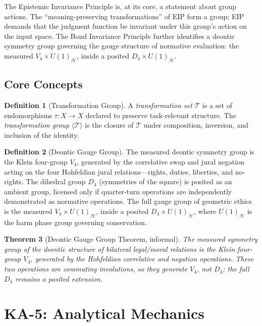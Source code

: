 \documentclass[12pt,letterpaper]{article}
\newtheorem{theorem}{Theorem}[section]
\theoremstyle{definition}
\newtheorem{definition}[theorem]{Definition}
\theoremstyle{plain}
\newcommand{\calT}{\mathcal{T}}
\newcommand{\calH}{\mathcal{H}}
\newcommand{\genT}{\langle \mathcal{T} \rangle}
\begin{document}
The Epistemic Invariance Principle is, at its core, a statement about group actions. The ``meaning-preserving transformations'' of EIP form a group; EIP demands that the judgment function be invariant under this group's action on the input space. The Bond Invariance Principle further identifies a deontic symmetry group governing the gauge structure of normative evaluation: the measured $V_4 \times U(1)_\calH$, inside a posited $D_4 \times U(1)_\calH$.

\subsection{Core Concepts}

\begin{definition}[Transformation Group]
A \emph{transformation set} $\calT$ is a set of endomorphisms $\tau: X \to X$ declared to preserve task-relevant structure. The \emph{transformation group} $\genT$ is the closure of $\calT$ under composition, inversion, and inclusion of the identity.
\end{definition}

\begin{definition}[Deontic Gauge Group]
The measured deontic symmetry group is the Klein four-group $V_4$, generated by the correlative swap and jural negation acting on the four Hohfeldian jural relations---rights, duties, liberties, and no-rights.  The dihedral group $D_4$ (symmetries of the square) is posited as an ambient group, licensed only if quarter-turn operations are independently demonstrated as normative operations.  The full gauge group of geometric ethics is the measured $V_4 \times U(1)_\calH$, inside a posited $D_4 \times U(1)_\calH$, where $U(1)_\calH$ is the harm phase group governing conservation.
\end{definition}

\begin{theorem}[Deontic Gauge Group Theorem, informal]
The measured symmetry group of the deontic structure of bilateral legal/moral relations is the Klein four-group $V_4$, generated by the Hohfeldian correlative and negation operations.  These two operations are commuting involutions, so they generate $V_4$, not $D_4$; the full $D_4$ remains a posited extension.
\end{theorem}


\section{KA-5: Analytical Mechanics}
\label{sec:ka5}
\end{document}
